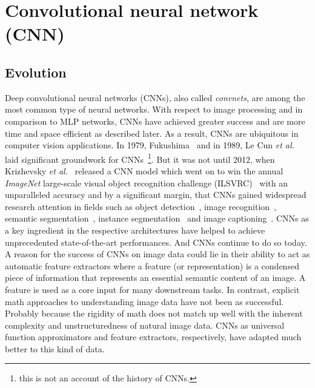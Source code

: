 \documentclass[a4paper,12pt]{report}
\begin{document}
\section{Convolutional neural network (CNN)}
\subsection{Evolution}
Deep convolutional neural networks (CNNs), also called \textit{convnets}, are among the most common type of neural networks. With respect to image processing and in comparison to MLP networks, CNNs have achieved greater success and are more time and space efficient as described later. As a result, CNNs are ubiquitous in computer vision applications. In 1979, Fukushima~\cite{FukushimaCnn79} and in 1989, Le Cun \textit{et al.}~\cite{CunGrounworkCNNs} laid significant groundwork for CNNs~\footnote{this is not an account of the history of CNNs.}. But it was not until 2012, when Krizhevsky \textit{et al.}~\cite{AlexNet} released a CNN model which went on to win the annual \textit{ImageNet} large-scale visual object recognition challenge (ILSVRC)~\cite{Imagenet} with an unparalleled accuracy and by a significant margin, that CNNs gained widespread research attention in fields such as object detection~\cite{FasterRCNN}, image recognition~\cite{AlexNet,DenseNet}, semantic segmentation~\cite{DeepLabv3+}, instance segmentation~\cite{MaskScoringRCNN} and image captioning~\cite{ImageCaptioningSOTA}. CNNs as a key ingredient in the respective architectures have helped to achieve unprecedented state-of-the-art performances. And CNNs continue to do so today. A reason for the success of CNNs on image data could lie in their ability to act as automatic feature extractors where a feature (or representation) is a condensed piece of information that represents an essential semantic content of an image. A feature is used as a core input for many downstream tasks. In contrast, explicit math approaches to understanding image data have not been as successful. Probably because the rigidity of math does not match up well with the inherent complexity and unstructuredness of natural image data. CNNs as universal function approximators and feature extractors, respectively, have adapted much better to this kind of data.
\end{document}
